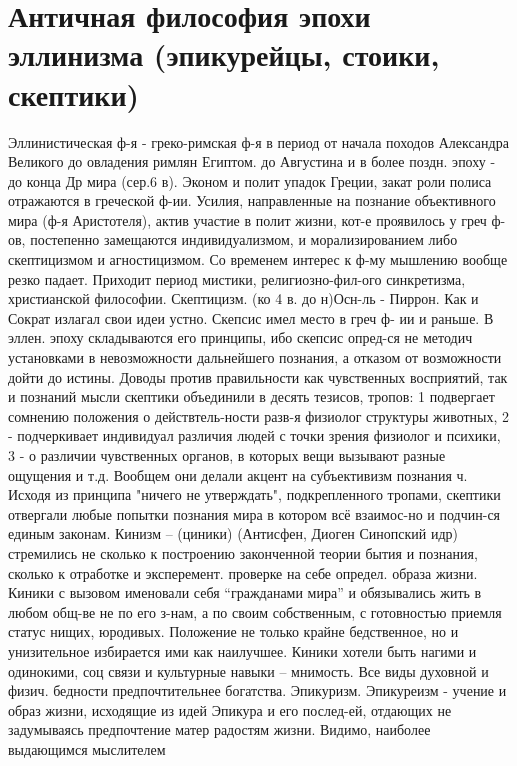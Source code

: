\documentclass[12pt]{article}
\begin{document}
\tableofcontents

\newpage
\section{Античная философия эпохи эллинизма (эпикурейцы, стоики, скептики)}
Эллинистическая ф-я - греко-римская ф-я в период от начала походов Александра Великого до овладения
римлян Египтом. до Августина и в более поздн. эпоху - до конца Др мира (сер.6 в). 
Эконом и полит упадок Греции, закат роли полиса отражаются в греческой ф-ии. Усилия, направленные на
познание объективного мира (ф-я Аристотеля), актив участие в полит жизни, кот-е проявилось у греч ф-ов,
постепенно  замещаются  индивидуализмом,  и  морализированием  либо  скептицизмом  и  агностицизмом.  Со
временем интерес к ф-му мышлению вообще резко падает. Приходит период мистики, религиозно-фил-ого
синкретизма, христианской философии. 
Скептицизм. (ко 4 в. до н)Осн-ль - Пиррон. Как и Сократ излагал свои идеи устно. Скепсис имел место в греч ф-
ии и раньше. В эллен. эпоху складываются его принципы, ибо скепсис опред-ся не методич установками в
невозможности  дальнейшего  познания,  а  отказом  от  возможности  дойти  до  истины.  Доводы  против
правильности как чувственных восприятий, так и познаний мысли скептики объединили в десять тезисов,
тропов: 
1 подвергает сомнению положения о действтель-ности разв-я физиолог структуры животных, 
2 - подчеркивает индивидуал различия людей с точки зрения физиолог и психики, 
3 - о различии чувственных органов, в которых вещи вызывают разные ощущения и т.д. Вообщем они делали
акцент на субъективизм познания ч. Исходя из принципа "ничего не утверждать", подкрепленного тропами,
скептики отвергали любые попытки познания мира в котором всё взаимос-но и подчин-ся единым законам. 
Кинизм – (циники) (Антисфен, Диоген Синопский идр) стремились не сколько к построению законченной
теории бытия и познания, сколько к отработке и эксперемент. проверке на себе определ. образа жизни. Киники с
вызовом именовали себя “гражданами мира” и обязывались жить в любом общ-ве не по его з-нам, а по своим
собственным, с готовностью приемля статус нищих, юродивых. Положение не только крайне бедственное, но и
унизительное избирается ими как наилучшее. Киники хотели быть нагими и одинокими, соц связи и культурные
навыки – мнимость. Все виды духовной и физич. бедности предпочтительнее богатства. 
Эпикуризм. Эпикуреизм - учение и образ жизни, исходящие из идей Эпикура и его послед-ей, отдающих не
задумываясь  предпочтение  матер  радостям  жизни.  Видимо,  наиболее  выдающимся  мыслителем
\end{document}
